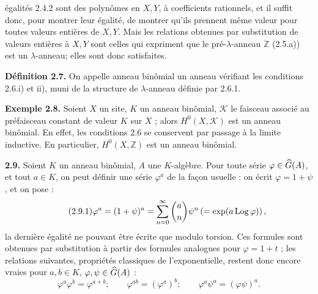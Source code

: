 égalités 2.4.2 sont des polynômes en \(X,Y\), à coefficients rationnels, et il suffit donc, pour montrer leur égalité, de montrer qu'ils prennent même valeur pour toutes valeurs entières de \(X,Y\). Mais les relations obtenues par substitution de valeurs entières à \(X,Y\) sont celles qui expriment que le pré-\(\lambda\)-anneau \(\mathbb Z\) (2.5.a)) est un \(\lambda\)-anneau; elles sont donc satisfaites.

\textbf{Définition 2.7.} On appelle anneau binômial un anneau vérifiant les conditions 2.6.i) et ii), muni de la structure de \(\lambda\)-anneau définie par 2.6.1.

\textbf{Exemple 2.8.} Soient \(X\) un site, \(K\) un anneau binômial, \(\mathcal K\) le faisceau associé au préfaisceau constant de valeur \(K\) sur \(X\) ; alors \(H^0(X,\mathcal K)\) est un anneau binômial. En effet, les conditions 2.6 se conservent par passage à la limite inductive. En particulier, \(H^0(X,\mathbb Z)\) est un anneau binômial.

\textbf{2.9.} Soient \(K\) un anneau binômial, \(A\) une \(K\)-algèbre. Pour toute série \(\varphi\in\Ghat(A)\), et tout \(a\in K\), on peut définir une série \(\varphi^a\) de la façon usuelle : on écrit \(\varphi=1+\psi\), et on pose :
\begin{equation}\tag{2.9.1}
  \varphi^a=(1+\psi)^a
  =
  \sum_{n=0}^{\infty}\binom{a}{n}\psi^n
  \left(=\exp(a\Log\varphi)\right),
\end{equation}
la dernière égalité ne pouvant être écrite que modulo torsion. Ces formules sont obtenues par substitution à partir des formules analogues pour \(\varphi=1+t\) ; les relations suivantes, propriétés classiques de l'exponentielle, restent donc encore vraies pour \(a,b\in K\), \(\varphi,\psi\in\Ghat(A)\) :
\begin{equation}\tag{2.9.2}
  \varphi^a\varphi^b=\varphi^{a+b};\qquad
  \varphi^{ab}=(\varphi^a)^b;\qquad
  \varphi^a\psi^a=(\varphi\psi)^a .
\end{equation}



\providecommand{\Ghat}{\widehat G}
\providecommand{\Gg}{\widehat G_g}
\providecommand{\Gcirc}{\widehat G_{\circ}}
\providecommand{\Gnabla}{\widehat G_{\nabla}}
\providecommand{\Grhat}{\widehat{\operatorname{Gr}}}
\providecommand{\Log}{\operatorname{Log}}
\providecommand{\Fil}{\operatorname{Fil}}
\providecommand{\eps}{\varepsilon}
\renewcommand{\id}{\operatorname{id}}
\providecommand{\Sym}{\operatorname{Sym}}
\providecommand{\Mon}{\operatorname{Mon}}


